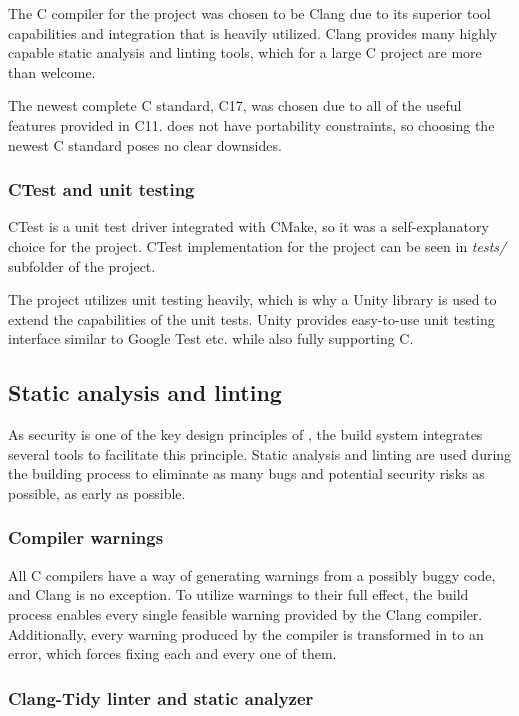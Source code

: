 The C compiler for the project was chosen to be Clang due to its superior tool
capabilities and integration that is heavily utilized. Clang provides many
highly capable static analysis and linting tools, which for a large C project
are more than welcome.

The newest complete C standard, C17, was chosen due to all of the useful
features provided in C11. \pman does not have portability constraints,
so choosing the newest C standard poses no clear downsides.

\subsubsection{CTest and unit testing}

CTest is a unit test driver integrated with CMake, so it was a self-explanatory
choice for the project. CTest implementation for the project can be seen in
\textit{tests/} subfolder of the project.

The \pman project utilizes unit testing heavily, which is why a Unity
library is used to extend the capabilities of the unit tests. Unity provides
easy-to-use unit testing interface similar to Google Test etc. while also fully
supporting C.

\subsection{Static analysis and linting}

As security is one of the key design principles of \pman, the build
system integrates several tools to facilitate this principle. Static analysis
and linting are used during the building process to eliminate as many bugs and
potential security risks as possible, as early as possible.

\subsubsection{Compiler warnings}

All C compilers have a way of generating warnings from a possibly buggy code,
and Clang is no exception. To utilize warnings to their full effect, the
\pman build process enables every single feasible warning provided by
the Clang compiler. Additionally, every warning produced by the compiler is
transformed in to an error, which forces fixing each and every one of them.

\subsubsection{Clang-Tidy linter and static analyzer}

